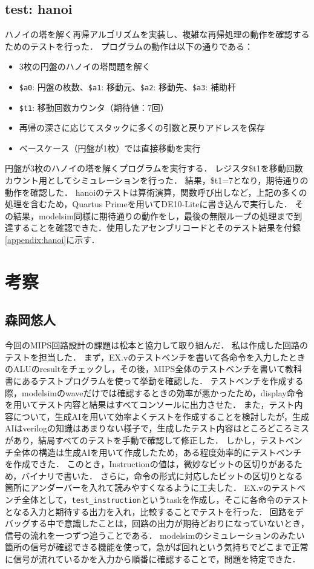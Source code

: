 \documentclass[dvipdfmx]{jsarticle}
\begin{document}
\subsection{test: hanoi}
ハノイの塔を解く再帰アルゴリズムを実装し、複雑な再帰処理の動作を確認するためのテストを行った．
プログラムの動作は以下の通りである：
\begin{itemize}
\item 3枚の円盤のハノイの塔問題を解く
\item \texttt{\$a0}: 円盤の枚数、\texttt{\$a1}: 移動元、\texttt{\$a2}: 移動先、\texttt{\$a3}: 補助杆
\item \texttt{\$t1}: 移動回数カウンタ（期待値：7回）
\item 再帰の深さに応じてスタックに多くの引数と戻りアドレスを保存
\item ベースケース（円盤が1枚）では直接移動を実行
\end{itemize}
円盤が3枚のハノイの塔を解くプログラムを実行する．
レジスタ\$t1を移動回数カウント用としてシミュレーションを行った．
結果，\$t1=7となり，期待通りの動作を確認した．
hanoiのテストは算術演算，関数呼び出しなど，上記の多くの処理を含むため，Quartus Primeを用いてDE10-Liteに書き込んで実行した．
その結果，modelsim同様に期待通りの動作をし，最後の無限ループの処理まで到達することを確認できた．使用したアセンブリコードとそのテスト結果を付録\ref{appendix:hanoi}に示す．



\section{考察}
\subsection{森岡悠人}
今回のMIPS回路設計の課題は松本と協力して取り組んだ．
私は作成した回路のテストを担当した．
まず，EX.vのテストベンチを書いて各命令を入力したときのALUのresultをチェックし，その後，MIPS全体のテストベンチを書いて教科書にあるテストプログラムを使って挙動を確認した．
テストベンチを作成する際，modelsimのwaveだけでは確認するときの効率が悪かったため，display命令を用いてテスト内容と結果はすべてコンソールに出力させた．
また，テスト内容について，生成AIを用いて効率よくテストを作成することを検討したが，生成AIはverilogの知識はあまりない様子で，生成したテスト内容はところどころミスがあり，結局すべてのテストを手動で確認して修正した．
しかし，テストベンチ全体の構造は生成AIを用いて作成したため，ある程度効率的にテストベンチを作成できた．
このとき，Instructionの値は，微妙なビットの区切りがあるため，バイナリで書いた．
さらに，命令の形式に対応したビットの区切りとなる箇所にアンダーバーを入れて読みやすくなるように工夫した．
EX.vのテストベンチ全体として，\texttt{test\_instruction}というtaskを作成し，そこに各命令のテストとなる入力と期待する出力を入れ，比較することでテストを行った．
回路をデバッグする中で意識したことは，回路の出力が期待どおりになっていないとき，信号の流れを一つずつ追うことである．
modelsimのシミュレーションのみたい箇所の信号が確認できる機能を使って，急がば回れという気持ちでどこまで正常に信号が流れているかを入力から順番に確認することで，問題を特定できた．
\end{document}
